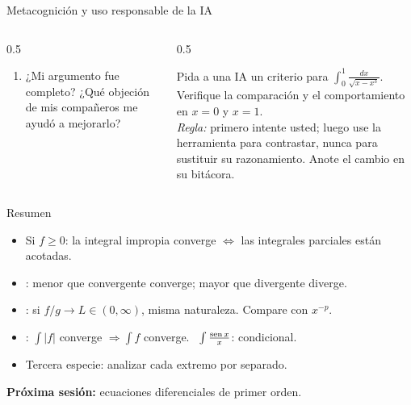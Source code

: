 \documentclass[10pt,aspectratio=169]{beamer}
\begin{document}
\begin{frame}{Metacognición y uso responsable de la IA}
  \small
  \begin{columns}[t]
    \begin{column}{0.5\textwidth}
      \begin{metacog}
        \begin{enumerate}
          \metacomun
          \item ¿Mi argumento fue completo? ¿Qué objeción de mis compañeros me ayudó a mejorarlo?
        \end{enumerate}
      \end{metacog}
    \end{column}
    \begin{column}{0.5\textwidth}
      \begin{iabox}
        Pida a una IA un criterio para $\int_0^1\frac{dx}{\sqrt{x-x^3}}$. Verifique la comparación y el comportamiento en $x=0$ y $x=1$.\\[2pt]
        \textit{Regla:} primero intente usted; luego use la herramienta para contrastar, nunca para sustituir su razonamiento. Anote el cambio en su bitácora.
      \end{iabox}
    \end{column}
  \end{columns}
\end{frame}

\begin{frame}{Resumen}
  \begin{itemize}
    \item Si $f\ge0$: la integral impropia converge $\iff$ las integrales parciales están acotadas.
    \item {}: menor que convergente converge; mayor que divergente diverge.
    \item {}: si $f/g\to L\in(0,\infty)$, misma naturaleza. Compare con $x^{-p}$.
    \item {}: $\int|f|$ converge $\Rightarrow\int f$ converge. \ $\int\frac{\operatorname{sen} x}{x}$: condicional.
    \item Tercera especie: analizar cada extremo por separado.
  \end{itemize}
  \vspace{3mm}
  \textbf{Próxima sesión:} ecuaciones diferenciales de primer orden.
\end{frame}
\end{document}

